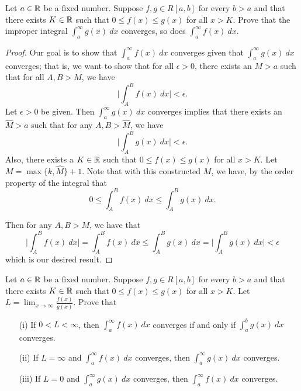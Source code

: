 \documentclass[a4paper]{article}
\begin{document}
\begin{problem}
    Let \( a \in \mathbb{R}  \) be a fixed number. Suppose \( f,g \in R[a,b] \) for every \(  b > a  \) and that there exists \( K \in \mathbb{R}  \) such that \( 0 \leq f(x) \leq g(x) \) for all \( x > K  \). Prove that the improper integral \( \int_{ a }^{ \infty  } g(x) \ dx   \) converges, so does \( \int_{ a }^{ \infty  } f(x) \ dx  \). 
\end{problem}
\begin{proof}
    Our goal is to show that \( \int_{ a }^{ \infty  } f(x) \ dx \) converges given that \( \int_{ a }^{ \infty  } g(x) \ dx   \) converges; that is, we want to show that for all \( \epsilon > 0  \), there exists an \( M > a  \) such that for all \( A,B > M  \), we have \[  \Big| \int_{ A }^{ B } f(x) \ dx  \Big| < \epsilon. \]
    Let \( \epsilon > 0  \) be given. Then \( \int_{ a }^{ \infty  } g(x) \ dx   \) converges implies that there exists an \( \hat{M} > a  \) such that for any \( A,B  > \hat{M} \), we have 
    \[  \Big| \int_{ A }^{ B } g(x) \ dx   \Big|  < \epsilon. \]
    Also, there exists a \( K \in \mathbb{R}  \) such that \( 0 \leq f(x) \leq g(x) \) for all \( x > K  \). Let \( M = \max \{ k , \hat{M} \}  + 1  \). Note that with this constructed \( M  \), we have, by the order property of the integral that
    \[  0 \leq \int_{ A }^{ B } f(x) \ dx \leq \int_{ A }^{ B } g(x) \ dx. \]

    Then for any \( A,B > M  \), we have that 
    \[  \Big| \int_{ A }^{ B } f(x) \ dx   \Big| = \int_{ A }^{ B }  f(x) \ dx   \leq  \int_{ A }^{ B }  g(x) \ dx = \Big| \int_{ A }^{ B } g(x) \ dx \Big|  < \epsilon \]
    which is our desired result.
\end{proof}

\begin{problem}
    Let \( a \in \mathbb{R}  \) be a fixed number. Suppose \( f,g \in R [a,b] \) for every \( b > a  \) and that there exists \( K \in \mathbb{R}  \) such that \( 0 \leq f(x) \leq g(x) \) for all \( x > K  \). Let \( L = \lim_{ x \to \infty  } \frac{ f(x) }{ g(x) }  \). Prove that  
    \begin{enumerate}
        \item[(i)] If \( 0 < L < \infty  \), then \( \int_{ a }^{ \infty  } f(x) \ dx   \) converges if and only if \( \int_{ a }^{ b } g(x) \ dx  \) converges.
        \item[(ii)] If \( L = \infty   \) and \( \int_{ a }^{ \infty  }  f(x)  \ dx  \) converges, then \( \int_{ a }^{ \infty  } g(x) \ dx   \) converges.
        \item[(iii)] If \( L = 0  \) and \( \int_{ a }^{ \infty  }  g(x) \ dx  \) converges, then \( \int_{ a }^{ \infty  } f(x) \ dx   \) converges.
    \end{enumerate}
\end{problem}
\end{document}
